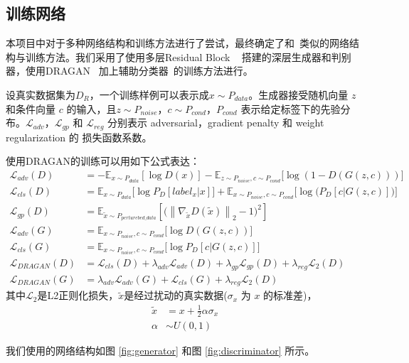\documentclass[a4paper,12pt,UTF8]{ctexart}
\newcommand{\norm}[1]{\left\lVert#1\right\rVert}
\begin{document}
\subsection{训练网络}

本项目中对于多种网络结构和训练方法进行了尝试，最终确定了和~\cite{Jin2017Towards}类似的网络结构与训练方法。我们采用了使用多层Residual Block ~\cite{he2016deep} 搭建的深层生成器和判别器，使用DRAGAN ~\cite{kodali2017convergence}加上辅助分类器~\cite{odena2016conditional}的训练方法进行。

设真实数据集为$D_R$，一个训练样例可以表示成$x \sim P_{data}$。生成器接受随机向量 $z$ 和条件向量 $c$ 的输入，且$z \sim P_{noise}$，$c \sim P_{cond}$，$P_{cond}$ 表示给定标签下的先验分布。$\mathcal{L}_{adv}$，$\mathcal{L}_{gp}$ 和 $\mathcal{L}_{reg}$ 分别表示 adversarial，gradient penalty 和 weight regularization 的 损失函数系数。

使用DRAGAN的训练可以用如下公式表达：
%
\begin{align}
  \mathcal{L}_{adv}(D) &= -\mathbb{E}_{x\sim P_{data}}[\log D(x)] - \mathbb{E}_{z\sim P_{noise},c\sim P_{cond}}\big[\log(1-D(G(z,c)))\big] \\
  \mathcal{L}_{cls}(D) &= \mathbb{E}_{x\sim P_{data}}\big[\log P_D[label_x|x]\big] + \mathbb{E}_{x\sim P_{noise},c\sim P_{cond}}\Big[\log\big(P_D[c|G(z,c)]\big)\Big] \\
  \mathcal{L}_{gp}(D) &= \mathbb{E}_{\tilde{x}\sim P_{perturebed\_data}}\left[\big(\norm{\nabla_{\tilde{x}}D(\tilde{x})}_2-1\big)^2\right] \\
  \mathcal{L}_{adv}(G) &= \mathbb{E}_{x\sim P_{noise},c\sim P_{cond}}\big[\log D(G(z,c))\big] \\
  \mathcal{L}_{cls}(G) &= \mathbb{E}_{x\sim P_{noise},c\sim P_{cond}}\big[\log P_D[c|G(z,c)]\big] \\
  \mathcal{L}_{DRAGAN}(D) &= \mathcal{L}_{cls}(D) + \lambda_{adv}\mathcal{L}_{adv}(D) + \lambda_{gp}\mathcal{L}_{gp}(D) + \lambda_{reg} \mathcal{L}_{2}(D) \\
  \mathcal{L}_{DRAGAN}(G) &= \lambda_{adv}\mathcal{L}_{adv}(G) + \mathcal{L}_{cls}(G) + \lambda_{reg} \mathcal{L}_{2}(D)
\end{align}
%
其中$\mathcal{L}_{2}$是L2正则化损失，$\tilde{x}$是经过扰动的真实数据($\sigma_x$ 为 $x$ 的标准差)，
%
\begin{align}
  \tilde{x} & = x + \frac{1}{2}\alpha\sigma_x \\
  \alpha & \sim U(0, 1)
\end{align}

我们使用的网络结构如图 \ref{fig:generator} 和图 \ref{fig:discriminator} 所示。
\end{document}
